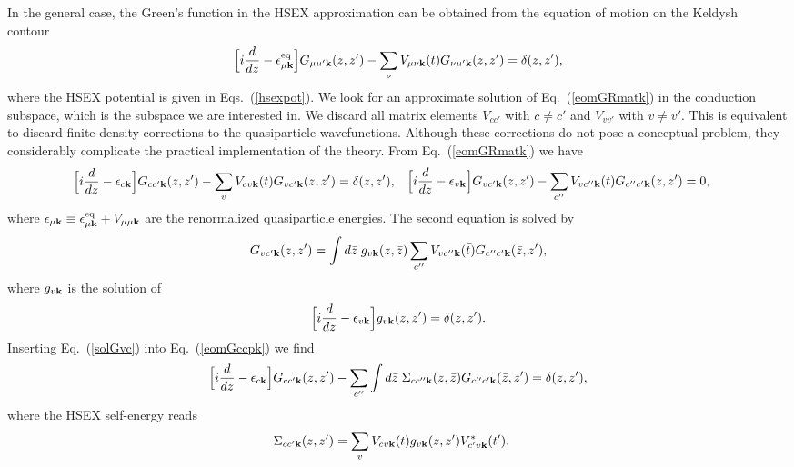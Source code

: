 \documentclass[twocolumn,aps,a4paper,superscriptaddress]{revtex4-2}
\begin{document}
\begin{widetext}
In the general case, the Green's function in the HSEX approximation
can be obtained from the
equation of motion on the Keldysh contour~\cite{svl-book_2025}
\begin{align}
\Big[i\frac{d}{dz}-\epsilon^{\rm eq}_{\mu{\mathbf k}}\Big]G_{\mu\mu'{\mathbf k}}(z,z')
-\sum_{\nu}V_{\mu\nu{\mathbf k}}(t)G_{\nu\mu'{\mathbf k}}(z,z')=\delta(z,z'),
\label{eomGRmatk}
\end{align}
where the HSEX potential is given in Eqs.~(\ref{hsexpot}).
We look for an approximate solution of Eq.~(\ref{eomGRmatk}) in
the conduction subspace, which is the subspace we are interested in.
We discard
all matrix elements $V_{cc'}$ with $c\neq c'$
and $V_{vv'}$ with $v\neq v'$. This is equivalent to discard
finite-density corrections to the
quasiparticle wavefunctions. Although these corrections do not pose a conceptual
problem, they considerably complicate the practical implementation of
the theory. From Eq.~(\ref{eomGRmatk}) we  have
\begin{subequations}
\begin{align}
\Big[i\frac{d}{dz}-\e_{c\blk}\Big]G_{cc'\blk}(z,z')
-\sum_{v}V_{cv\blk}(t)G_{vc'\blk}(z,z')&=\d(z,z')	,
\label{eomGccpk}
\end{align}
\begin{align}
\Big[i\frac{d}{dz}-\e_{v\blk}\Big]G_{vc'\blk}(z,z')
-\sum_{c''}V_{vc''\blk}(t)G_{c''c'\blk}(z,z')&=0	,
\end{align}
\end{subequations}
where  $\epsilon_{\mu{\mathbf k}}\equiv \epsilon^{\rm eq}_{\mu{\mathbf k}}+V_{\mu\mu{\mathbf k}}$ are the
renormalized quasiparticle energies.
The second equation is solved by
\begin{align}
G_{vc'{\mathbf k}}(z,z')=\int d\bar{z}\;g_{v{\mathbf k}}(z,\bar{z})
\sum_{c''}V_{vc''{\mathbf k}}(\bar{t})G_{c''c'{\mathbf k}}(\bar{z},z'),
\label{solGvc}
\end{align}
where $g_{v{\mathbf k}}$ is the solution of
\begin{align}
\Big[i\frac{d}{dz}-\epsilon_{v{\mathbf k}}\Big]g_{v{\mathbf k}}(z,z')=\delta(z,z')	.
\label{eomgvk}
\end{align}
Inserting Eq.~(\ref{solGvc}) into Eq.~(\ref{eomGccpk}) we find
\begin{align}
\Big[i\frac{d}{dz}-\epsilon_{c{\mathbf k}}\Big]G_{cc'{\mathbf k}}(z,z')
-\sum_{c''}\int d\bar{z}\;\Sigma_{cc''{\mathbf k}}(z,\bar{z})
G_{c''c'{\mathbf k}}(\bar{z},z')
=\delta(z,z')	,
\label{eomGccp2}
\end{align}
where the HSEX self-energy reads
\begin{align}
\Sigma_{cc'{\mathbf k}}(z,z')&=
\sum_{v}V_{cv{\mathbf k}}(t) g_{v{\mathbf k}}(z,z')
V^{\ast}_{c'v{\mathbf k}}(t').
\label{sigmahsex1}
\end{align}


\end{widetext}
\end{document}
